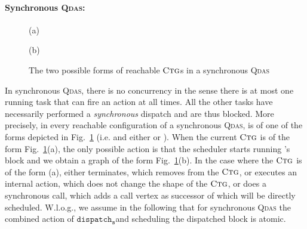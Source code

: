 \documentclass[runningheads,oribibl,]{article}
\newcommand{\cfont}[1]{\ensuremath{\mathtt{#1}}\xspace}
\newcommand{\qdas}{\textsc{Qdas}\xspace}
\newcommand{\ctg}{\ensuremath{\textsc{Ctg}}\xspace}
\newcommand{\disps}{\ensuremath{\cfont{dispatch_s}}}
\begin{document}
\paragraph{\bf Synchronous \qdas:}

\begin{figure}[!t]
  \centering(a)
  \hspace*{1cm}(b)
  \caption{The two possible forms of reachable {\ctg}s in a synchronous \qdas}
  \label{fig:config-sync}
\end{figure}


In synchronous \qdas, there is no concurrency in the sense there is at
most one running task that can fire an action at all times. All the
other tasks have necessarily performed a \emph{synchronous} dispatch
and are thus blocked. More precisely, in every reachable configuration
 of a synchronous \qdas,  is of one of the
forms depicted in Fig.~\ref{fig:config-sync}
(i.e.  and either  or ). When the current \ctg is of the form
Fig.~\ref{fig:config-sync}(a), the only possible action is that the
scheduler starts running 's block and we obtain a graph of the
form Fig.~\ref{fig:config-sync}(b). In the case where the \ctg is of
the form (a), either  terminates, which removes  from the
\ctg, or  executes an internal action, which does not change the
shape of the \ctg, or  does a synchronous call, which adds a call
vertex as successor of  which will be directly
scheduled. W.l.o.g., we assume in the following that for synchronous
\qdas the combined action of \disps and scheduling the dispatched
block is atomic.
\end{document}

